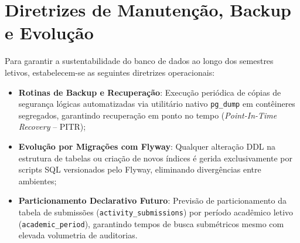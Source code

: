 \section{Diretrizes de Manutenção, Backup e Evolução}
\label{sec_diretrizes_evolucao}

Para garantir a sustentabilidade do banco de dados ao longo dos semestres letivos, estabelecem-se as seguintes diretrizes operacionais:

\begin{itemize}
    \item \textbf{Rotinas de Backup e Recuperação}: Execução periódica de cópias de segurança lógicas automatizadas via utilitário nativo \texttt{pg\_dump} em contêineres segregados, garantindo recuperação em ponto no tempo (\textit{Point-In-Time Recovery} -- PITR);
    \item \textbf{Evolução por Migrações com Flyway}: Qualquer alteração DDL na estrutura de tabelas ou criação de novos índices é gerida exclusivamente por scripts SQL versionados pelo Flyway, eliminando divergências entre ambientes;
    \item \textbf{Particionamento Declarativo Futuro}: Previsão de particionamento da tabela de submissões (\texttt{activity\_\-submissions}) por período acadêmico letivo (\texttt{academic\_\-period}), garantindo tempos de busca submétricos mesmo com elevada volumetria de auditorias.
\end{itemize}
